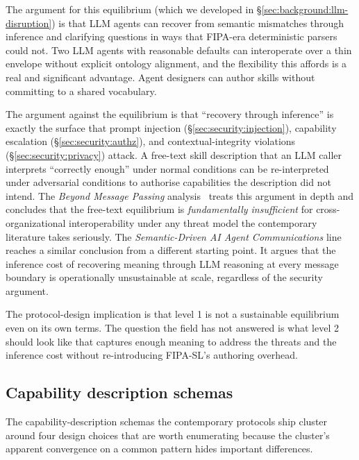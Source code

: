 The argument for this equilibrium (which we developed in
\S\ref{sec:background:llm-disruption}) is that LLM agents can
recover from semantic mismatches through inference and clarifying
questions in ways that FIPA-era deterministic parsers could not.
Two LLM agents with reasonable defaults can interoperate over a
thin envelope without explicit ontology alignment, and the
flexibility this affords is a real and significant advantage.
Agent designers can author skills without committing to a shared
vocabulary.

The argument against the equilibrium is that ``recovery through
inference'' is exactly the surface that prompt injection
(\S\ref{sec:security:injection}), capability escalation
(\S\ref{sec:security:authz}), and contextual-integrity violations
(\S\ref{sec:security:privacy}) attack. A free-text skill
description that an LLM caller interprets ``correctly enough''
under normal conditions can be re-interpreted under
adversarial conditions to authorise capabilities the
description did not intend. The \emph{Beyond Message Passing}
analysis~\cite{beyond_message_passing} treats this argument
in depth and concludes that the free-text equilibrium is
\emph{fundamentally insufficient} for
cross-organizational interoperability under any threat model
the contemporary literature takes seriously. The
\emph{Semantic-Driven AI Agent Communications} line~\cite{semantic_driven}
reaches a similar conclusion from a different starting point.
It argues that the inference cost of recovering meaning through
LLM reasoning at every message boundary is operationally
unsustainable at scale, regardless of the security argument.

The protocol-design implication is that level 1 is not a
sustainable equilibrium even on its own terms. The question
the field has not answered is what level 2 should look like
that captures enough meaning to address the threats and the
inference cost without re-introducing FIPA-SL's authoring
overhead.

\subsection{Capability description schemas}
\label{sec:semantic:capabilities}

The capability-description schemas the contemporary protocols
ship cluster around four design choices that are worth
enumerating because the cluster's apparent convergence on a
common pattern hides important differences.

